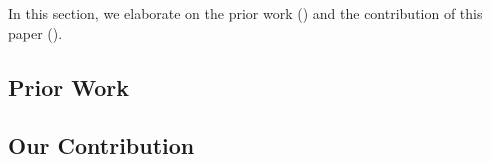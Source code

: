 In this section, we elaborate on the prior work () and the
contribution of this paper ().

\subsection{Prior Work} 


\subsection{Our Contribution} 

